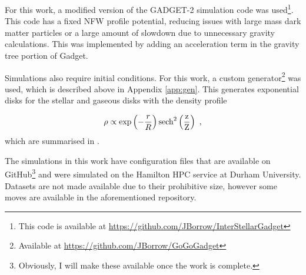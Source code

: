 For this work, a modified version of the GADGET-2 simulation code \citep{springel_cosmological_2005} was
used\footnote{This code is available at
  \url{https://github.com/JBorrow/InterStellarGadget}}. This code has a fixed
NFW profile potential, reducing issues with large mass dark matter
particles or a large amount of slowdown due to unnecessary gravity
calculations. This was implemented by adding an acceleration term in the
gravity tree portion of Gadget.

Simulations also require initial conditions. For this work, a custom
generator\footnote{Available at \url{https://github.com/JBorrow/GoGoGadget}}
was used, which is described above in Appendix \ref{app:gen}. This generates exponential disks for the stellar and gaseous
disks with the density profile

\begin{equation}
\rho \propto \exp\left(-\frac{r}{R}\right)\rm{sech}^2\left(\frac{z}{Z}\right)~,
\end{equation}
which are summarised in \citet{ferriere_interstellar_2001}.

The simulations in this work have configuration files that are
available on GitHub\footnote{Obviously, I will make these available once the work is complete.} and were simulated on the
Hamilton HPC service at Durham University. Datasets are not made
available due to their prohibitive size, however some moves are
available in the aforementioned repository.

